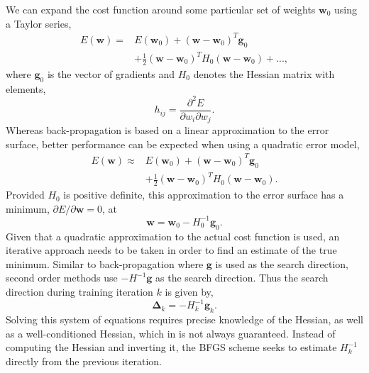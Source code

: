 \documentclass[useAMS,usenatbib]{mnras}
\begin{document}
We can expand the cost function around some particular set of weights $\boldsymbol{w}_0$ using a Taylor series,
\begin{equation}
\begin{aligned}
E(\boldsymbol{w}) = & E(\boldsymbol{w}_0) + (\boldsymbol{w} - \boldsymbol{w}_0)^T \boldsymbol{g}_0\\
&+\frac{1}{2} (\boldsymbol{w} - \boldsymbol{w}_0)^T H_0 (\boldsymbol{w}-\boldsymbol{w}_0) +  ... ,
\end{aligned}
\end{equation}
where $\boldsymbol{g}_0$ is the vector of gradients and $H_0$ denotes the Hessian matrix with elements, 
\begin{equation}
h_{ij} = \frac{\partial^2 E}{\partial w_i \partial w_j}.
\end{equation} 
Whereas back-propagation is based on a linear approximation to the error surface, better performance can be expected when using a quadratic error model,
\begin{equation}
\begin{aligned}
E(\boldsymbol{w}) \approx &E(\boldsymbol{w}_0) + (\boldsymbol{w} - \boldsymbol{w}_0)^T \boldsymbol{g}_0\\
&+ \frac{1}{2}(\boldsymbol{w} - \boldsymbol{w}_0)^T H_0 (\boldsymbol{w}-\boldsymbol{w}_0).
\end{aligned}
\end{equation}
Provided $H_0$ is positive definite, this approximation to the error surface has a minimum, $\partial E/\partial \boldsymbol{w} = 0$, at
\begin{equation}
\boldsymbol{w} = \boldsymbol{w}_0 - H_0^{-1}\boldsymbol{g}_0.
\end{equation} 
Given that a quadratic approximation to the actual cost function is used, an iterative approach needs to be taken in order to find an estimate of the true minimum.
Similar to back-propagation where $\boldsymbol{g}$ is used as the search direction, second order methods use $ -H^{-1}\boldsymbol{g}$ as the search direction.
Thus the search direction during training iteration $k$ is given by,
\begin{equation}
\boldsymbol{\Delta}_k = - H_k^{-1}\boldsymbol{g}_k.
\end{equation}
Solving this system of equations requires precise knowledge of the Hessian, as well as a well-conditioned Hessian, which in is not always guaranteed. 
Instead of computing the Hessian and inverting it, the BFGS scheme seeks to estimate $H^{-1}_k$ directly from the previous iteration.
\end{document}
